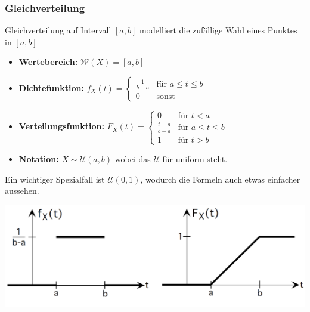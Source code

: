 \subsubsection{Gleichverteilung}
Gleichverteilung auf Intervall $[a,b]$ modelliert die zufällige Wahl eines Punktes in $[a,b]$
\begin{itemize}
\item \textbf{Wertebereich:} $\mathcal{W}(X) = [a,b]$
\item \textbf{Dichtefunktion:} $f_X(t) = \begin{cases} \frac{1}{b-a} & \mbox{für } a \leq t \leq b \\ 0 &  \mbox{sonst} \end{cases}$
\item \textbf{Verteilungsfunktion:} $F_X(t) = \begin{cases} 0 & \mbox{für } t < a \\ \frac{t-a}{b-a} & \mbox{für } a \leq t \leq b \\ 1 & \mbox{für } t > b \end{cases}$
\item \textbf{Notation:} $X \sim \mathcal{U}(a,b)$ wobei das $\mathcal{U}$ für uniform steht.
\end{itemize}
Ein wichtiger Spezialfall ist $\mathcal{U}(0,1)$, wodurch die Formeln auch etwas einfacher aussehen.
\begin{center}
\includegraphics[scale=0.2]{gleichverteilung.png}
\end{center}

